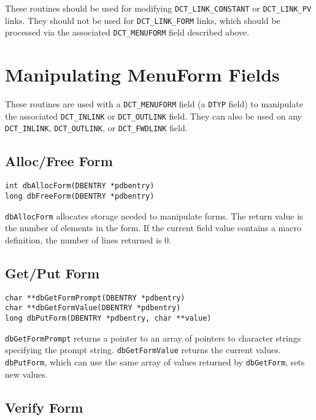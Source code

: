 These routines should be used for modifying \verb|DCT_LINK_CONSTANT| or \verb|DCT_LINK_PV| links. They should not be used 
for \verb|DCT_LINK_FORM| links, which should be processed via the associated \verb|DCT_MENUFORM| field described above.

\section{Manipulating MenuForm Fields}

These routines are used with a \verb|DCT_MENUFORM| field (a \verb|DTYP| field) to manipulate the associated \verb|DCT_INLINK| or 
\verb|DCT_OUTLINK| field. They can also be used on any \verb|DCT_INLINK|, \verb|DCT_OUTLINK|, or \verb|DCT_FWDLINK| field.

\subsection{Alloc/Free Form}

\begin{verbatim}
int dbAllocForm(DBENTRY *pdbentry)
long dbFreeForm(DBENTRY *pdbentry)
\end{verbatim}

\verb|dbAllocForm| allocates storage needed to manipulate forms. The return value is the number of elements in the form. If 
the current field value contains a macro definition, the number of lines returned is 0.

\subsection{Get/Put Form}

\begin{verbatim}
char **dbGetFormPrompt(DBENTRY *pdbentry)
char **dbGetFormValue(DBENTRY *pdbentry)
long dbPutForm(DBENTRY *pdbentry, char **value)
\end{verbatim}

\verb|dbGetFormPrompt| returns a pointer to an array of pointers to character strings specifying the prompt string. 
\verb|dbGetFormValue| returns the current values. \verb|dbPutForm|, which can use the same array of values returned by 
\verb|dbGetForm|, sets new values.

\subsection{Verify Form}


